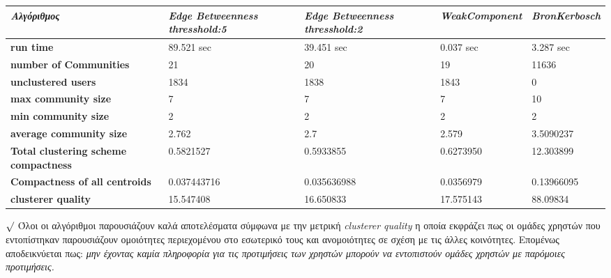 \hspace{-10.0em}   
  \begin{tabular}{ | p{6cm} | p{3cm} | p{3cm} | l | l |}
    \hline
    \emph{Αλγόριθμος}				   & \emph{Edge Betweenness thresshold:5} & \emph{Edge Betweenness thresshold:2 } & \emph{WeakComponent} & \emph{BronKerbosch} \\ \hline \hline
    \textbf{run time}			 	   & 89.521 sec		     	   & 39.451 sec		     	    & 0.037 sec	     	    & 3.287 sec	   	\\ \hline  
    \textbf{number of Communities} 	           & 21			     	   & 20			     	    & 19		    & 11636		   \\ \hline
    \textbf{unclustered users} 	 	   & 1834		     	   & 1838		     	    & 1843   		    & 0		   	\\ \hline
    \textbf{max community size} 	 	   & 7			     	   & 7			     	    & 7  		    & 10	     	   \\ \hline
    \textbf{min community size} 	 	   & 2			     	   & 2			     	    & 2 	     	    & 2		   	\\ \hline
    \textbf{average community size}	 	   & 2.762 		     	   & 2.7 		     	    & 2.579 	     	    & 3.5090237	  	 \\ \hline
    \textbf{Total clustering scheme compactness}  & 0.5821527  	     	   & 0.5933855  	     	    & 0.6273950	     	    & 12.303899	   	\\ \hline
    \textbf{Compactness of all centroids} 	   & 0.037443716  	     	   & 0.035636988  	     	    & 0.0356979 	    & 0.13966095	   \\ \hline
    \textbf{clusterer quality} 		   & 15.547408	 	     	   & 16.650833	 	     	    & 17.575143  	    & 88.09834		   \\ 
    \hline
  \end{tabular}

\vspace{1cm}

$\surd$ \noindent
Όλοι οι αλγόριθμοι παρουσιάζουν καλά αποτελέσματα σύμφωνα με την μετρική \emph{clusterer quality}
η οποία εκφράζει πως οι ομάδες χρηστών που εντοπίστηκαν παρουσιάζουν ομοιότητες περιεχομένου στο εσωτερικό
τους και ανομοιότητες σε σχέση με τις άλλες κοινότητες.
Επομένως αποδεικνύεται πως: \emph{μην έχοντας καμία πληροφορία για τις προτιμήσεις των χρηστών  
μπορούν να εντοπιστούν ομάδες χρηστών με παρόμοιες προτιμήσεις.} 

